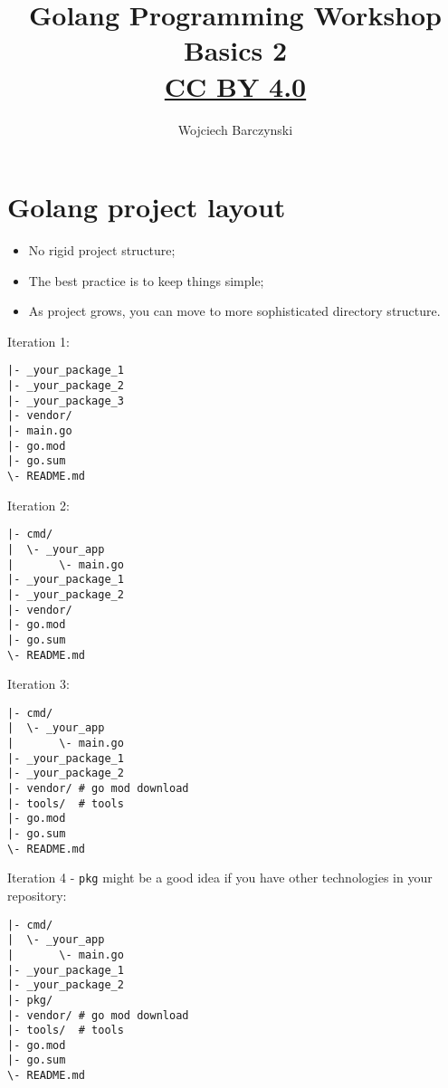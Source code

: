 \documentclass[11pt, letterpaper]{article}
\title{Golang Programming Workshop\\Basics 2\\{ \small \href{https://creativecommons.org/licenses/by/4.0/}{CC BY 4.0} }  }
\author{Wojciech Barczynski}
\date{}
\begin{document}

\begin{titlepage}
\maketitle
\end{titlepage}

\tableofcontents
\pagebreak

\section{Golang project layout}

\begin{itemize}%
\item No rigid project structure;
\item The best practice is to keep things simple;
\item As project grows, you can move to more sophisticated directory structure.
\end{itemize}%

Iteration 1:

\begin{verbatim}
|- _your_package_1
|- _your_package_2
|- _your_package_3
|- vendor/
|- main.go
|- go.mod
|- go.sum
\- README.md
\end{verbatim}

Iteration 2:

\begin{verbatim}
|- cmd/
|  \- _your_app
|       \- main.go
|- _your_package_1
|- _your_package_2
|- vendor/
|- go.mod
|- go.sum
\- README.md
\end{verbatim}

Iteration 3:

\begin{verbatim}
|- cmd/
|  \- _your_app
|       \- main.go
|- _your_package_1
|- _your_package_2
|- vendor/ # go mod download
|- tools/  # tools
|- go.mod
|- go.sum
\- README.md
\end{verbatim}

Iteration 4 - \verb|pkg| might be a good idea if you have other technologies in your repository:

\begin{verbatim}
|- cmd/
|  \- _your_app
|       \- main.go
|- _your_package_1
|- _your_package_2
|- pkg/
|- vendor/ # go mod download
|- tools/  # tools
|- go.mod
|- go.sum
\- README.md
\end{verbatim}
\end{document}
